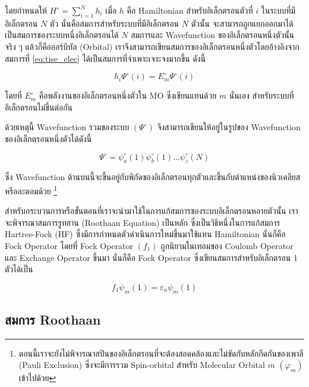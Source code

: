 โดยกำหนดให้ $H^{\circ} = \sum^{N}_{i=1} h_{i}$ เมื่อ $h$ คือ Hamiltonian สำหรับอิเล็กตรอนตัวที่ $i$ ในระบบที่มีอิเล็กตรอน 
$N$ ตัว นั่นคือสมการสำหรับระบบที่มีอิเล็กตรอน $N$ ตัวนั้น จะสามารถถูกแยกออกมาได้เป็นสมการของระบบหนึ่งอิเล็กตรอนได้ $N$ สมการและ 
Wavefunction ของอิเล็กตรอนหนึ่งตัวนั้นจริง ๆ แล้วก็คือออร์บิทัล (Orbital) เราจึงสามารถเขียนสมการของอิเล็กตรอนหนึ่งตัวโดยอ้างอิงจาก%
สมการที่ \ref{eq:tise_elec} ได้เป็นสมการที่จำเพาะเจาะจงมากขึ้น ดังนี้

\begin{equation}\label{eq:tise_elec_i}
    h_{i} \Psi^{\circ}(i) = E^{\circ}_{m} \Psi^{\circ}(i)
\end{equation}

\noindent โดยที่ $E^{\circ}_{m}$ คือพลังงานของอิเล็กตรอนหนึ่งตัวใน MO ซึ่งเขียนแทนด้วย $m$ นั่นเอง สำหรับระบบที่อิเล็กตรอนไม่ขึ้นต่อกัน

ด้วยเหตุนี้ Wavefunction รวมของระบบ $(\Psi^{\circ})$ จึงสามารถเขียนให้อยู่ในรูปของ Wavefunction ของอิเล็กตรอนหนึ่งตัวได้ดังนี้

\begin{equation}
    \Psi^{\circ} = \psi^{\circ}_{a}(1) \psi^{\circ}_{b}(1) \dots \psi^{\circ}_{z}(N)
\end{equation}

\noindent ซึ่ง Wavefunction ด้านบนนี้จะขึ้นอยู่กับพิกัดของอิเล็กตรอนทุกตัวและขึ้นกับตำแหน่งของนิวเคลียสหรืออะตอมด้วย%
\footnote{ตอนนี้เราจะยังไม่พิจารณาสปินของอิเล็กตรอนที่จะต้องสอดคล้องและไม่ขัดกับหลักกีดกันของเพาลี (Pauli Exclusion)
ซึ่งจะมีการรวม Spin-orbital สำหรับ Molecular Orbital $m$ $(\varphi_{m})$ เข้าไปด้วย}

สำหรับกระบวนการหรือขั้นตอนที่เราจะนำมาใช้ในการแก้สมการของระบบอิเล็กตรอนหลายตัวนั้น เราจะพิจารณาสมการรูทฮาน (Roothaan Equation) 
เป็นหลัก ซึ่งเป็นวิธีหนึ่งในการแก้สมการ Hartree-Fock (HF) ซึ่งมีการกำหนดตัวดำเนินการใหม่ขึ้นมาใช้แทน Hamiltonian นั่นก็คือ Fock Operator 
โดยที่ Fock Operator $(f_{1})$ ถูกนิยามในเทอมของ Coulomb Operator และ Exchange Operator ขึ้นมา นั่นก็คือ Fock Operator 
ซึ่งเขียนสมการสำหรับอิเล็กตรอน 1 ตัวได้เป็น

\begin{equation}\label{eq:fock}
    f_{1} \psi_{m}(1) = \varepsilon_{n} \psi_{m}(1)
\end{equation}

\subsection{สมการ Roothaan}
\label{ssec:roothaan}

